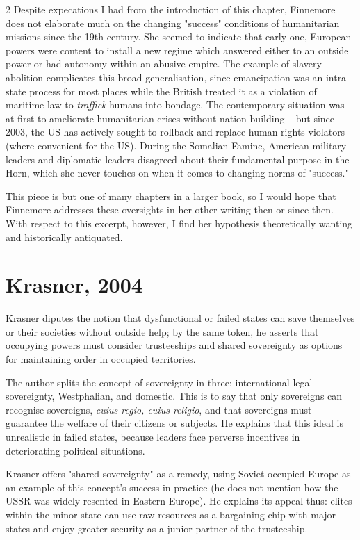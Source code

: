 \documentclass[letterpaper,12pt,twoside]{article}
\begin{document}
\begin {multicols}{2}
Despite expecations I had from the introduction of this chapter, Finnemore does not elaborate much on the changing "success" conditions of humanitarian missions since the 19th century. She seemed to indicate that early one, European powers were content to install a new regime which answered either to an outside power or had autonomy within an abusive empire. The example of slavery abolition complicates this broad generalisation, since emancipation was an intra-state process for most places while the British treated it as a violation of maritime law to \textit{traffick} humans into bondage. The contemporary situation was at first to ameliorate humanitarian crises without nation building – but since 2003, the US has actively sought to rollback and replace human rights violators (where convenient for the US). During the Somalian Famine, American military leaders and diplomatic leaders disagreed about their fundamental purpose in the Horn, which she never touches on when it comes to changing norms of "success."

This piece is but one of many chapters in a larger book, so I would hope that Finnemore addresses these oversights in her other writing then or since then. With respect to this excerpt, however, I find her hypothesis theoretically wanting and historically antiquated.

\vfill\null
\columnbreak

\section*{Krasner, 2004}
Krasner diputes the notion that dysfunctional or failed states can save themselves or their societies without outside help; by the same token, he asserts that occupying powers must consider trusteeships and shared sovereignty as options for maintaining order in occupied territories.

The author splits the concept of sovereignty in three: international legal sovereignty, Westphalian, and domestic. This is to say that only sovereigns can recognise sovereigns, \textit{cuius regio, cuius religio}, and that sovereigns must guarantee the welfare of their citizens or subjects. He explains that this ideal is unrealistic in failed states, because leaders face perverse incentives in deteriorating political situations.

Krasner offers "shared sovereignty" as a remedy, using Soviet occupied Europe as an example of this concept's success in practice (he does not mention how the USSR was widely resented in Eastern Europe). He explains its appeal thus: elites within the minor state can use raw resources as a bargaining chip with major states and enjoy greater security as a junior partner of the trusteeship.


\end{multicols}
\end{document}
